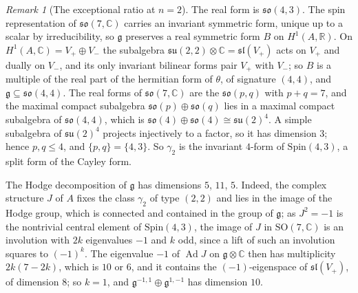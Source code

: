 \documentclass[11pt,reqno]{amsart}
\theoremstyle{plain}
\theoremstyle{definition}
\theoremstyle{remark}
\newtheorem{remark}[theorem]{Remark}
\newcommand{\RR}{\mathbb{R}}
\newcommand{\CC}{\mathbb{C}}
\begin{document}
\begin{remark}[The exceptional ratio at $n=2$]
The real form is $\mathfrak{so}(4,3)$. The spin representation of
$\mathfrak{so}(7,\CC)$ carries an invariant symmetric form, unique up to a
scalar by irreducibility, so $\mathfrak{g}$ preserves a real symmetric form
$B$ on $H^{1}(A,\RR)$. On $H^{1}(A,\CC)=V_{+}\oplus V_{-}$ the subalgebra
$\mathfrak{su}(2,2)\otimes\CC=\mathfrak{sl}(V_{+})$ acts on $V_{+}$ and
dually on $V_{-}$, and its only invariant bilinear forms pair $V_{+}$ with
$V_{-}$; so $B$ is a multiple of the real part of the hermitian form of
$\theta$, of signature $(4,4)$, and $\mathfrak{g}\subseteq\mathfrak{so}(4,4)$.
The real forms of $\mathfrak{so}(7,\CC)$ are the $\mathfrak{so}(p,q)$ with
$p+q=7$, and the maximal compact subalgebra $\mathfrak{so}(p)\oplus
\mathfrak{so}(q)$ lies in a maximal compact subalgebra of
$\mathfrak{so}(4,4)$, which is $\mathfrak{so}(4)\oplus\mathfrak{so}(4)\cong
\mathfrak{su}(2)^{4}$. A simple subalgebra of $\mathfrak{su}(2)^{4}$ projects
injectively to a factor, so it has dimension $3$; hence $p,q\le4$, and
$\{p,q\}=\{4,3\}$. So $\gamma_{2}$ is the invariant $4$-form of
$\mathrm{Spin}(4,3)$, a split form of the Cayley form.

The Hodge decomposition of $\mathfrak{g}$ has dimensions $5$, $11$, $5$.
Indeed, the complex structure $J$ of $A$ fixes the class $\gamma_{2}$ of type
$(2,2)$ and lies in the image of the Hodge group, which is connected and
contained in the group of $\mathfrak{g}$; as $J^{2}=-1$ is the nontrivial
central element of $\mathrm{Spin}(4,3)$, the image of $J$ in
$\mathrm{SO}(7,\CC)$ is an involution with $2k$ eigenvalues $-1$ and $k$
odd, since a lift of such an involution squares to $(-1)^{k}$. The
eigenvalue $-1$ of $\operatorname{Ad}J$ on $\mathfrak{g}\otimes\CC$ then has
multiplicity $2k(7-2k)$, which is $10$ or $6$, and it contains the
$(-1)$-eigenspace of $\mathfrak{sl}(V_{+})$, of dimension $8$; so $k=1$, and
$\mathfrak{g}^{-1,1}\oplus\mathfrak{g}^{1,-1}$ has dimension $10$.


\end{remark}
\end{document}
